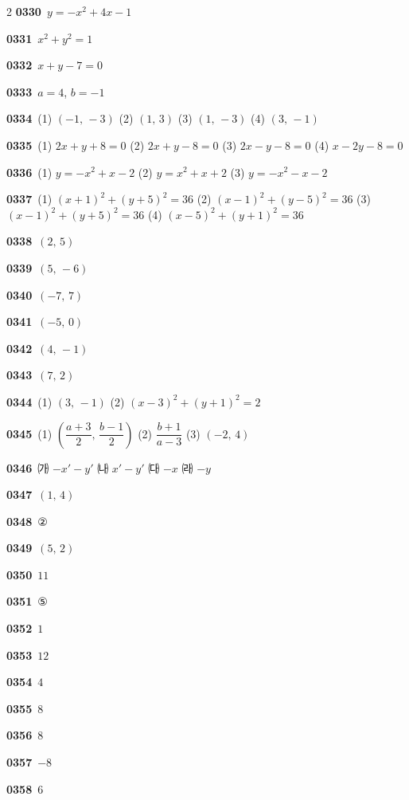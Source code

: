 \documentclass[10pt,a4paper]{article}
\begin{document}
\begin{multicols}{2}
\noindent\textbf{0330}\ $y=-x^2+4x-1$\par
\noindent\textbf{0331}\ $x^2+y^2=1$\par
\noindent\textbf{0332}\ $x+y-7=0$\par
\noindent\textbf{0333}\ $a=4$, $b=-1$\par
\noindent\textbf{0334}\ (1) $(-1,\,-3)$ (2) $(1,\,3)$ (3) $(1,\,-3)$ (4) $(3,\,-1)$\par
\noindent\textbf{0335}\ (1) $2x+y+8=0$ (2) $2x+y-8=0$ (3) $2x-y-8=0$ (4) $x-2y-8=0$\par
\noindent\textbf{0336}\ (1) $y=-x^2+x-2$ (2) $y=x^2+x+2$ (3) $y=-x^2-x-2$\par
\noindent\textbf{0337}\ (1) $(x+1)^2+(y+5)^2=36$ (2) $(x-1)^2+(y-5)^2=36$ (3) $(x-1)^2+(y+5)^2=36$ (4) $(x-5)^2+(y+1)^2=36$\par
\noindent\textbf{0338}\ $(2,\,5)$\par
\noindent\textbf{0339}\ $(5,\,-6)$\par
\noindent\textbf{0340}\ $(-7,\,7)$\par
\noindent\textbf{0341}\ $(-5,\,0)$\par
\noindent\textbf{0342}\ $(4,\,-1)$\par
\noindent\textbf{0343}\ $(7,\,2)$\par
\noindent\textbf{0344}\ (1) $(3,\,-1)$ (2) $(x-3)^2+(y+1)^2=2$\par
\noindent\textbf{0345}\ (1) $\left(\dfrac{a+3}{2},\,\dfrac{b-1}{2}\right)$ (2) $\dfrac{b+1}{a-3}$ (3) $(-2,\,4)$\par
\noindent\textbf{0346}\ ㈎ $-x'-y'$ \quad ㈏ $x'-y'$ \quad ㈐ $-x$ \quad ㈑ $-y$\par
\noindent\textbf{0347}\ $(1,\,4)$\par
\noindent\textbf{0348}\ ②\par
\noindent\textbf{0349}\ $(5,\,2)$\par
\noindent\textbf{0350}\ $11$\par
\noindent\textbf{0351}\ ⑤\par
\noindent\textbf{0352}\ $1$\par
\noindent\textbf{0353}\ $12$\par
\noindent\textbf{0354}\ $4$\par
\noindent\textbf{0355}\ $8$\par
\noindent\textbf{0356}\ $8$\par
\noindent\textbf{0357}\ $-8$\par
\noindent\textbf{0358}\ $6$\par

\end{multicols}
\end{document}
